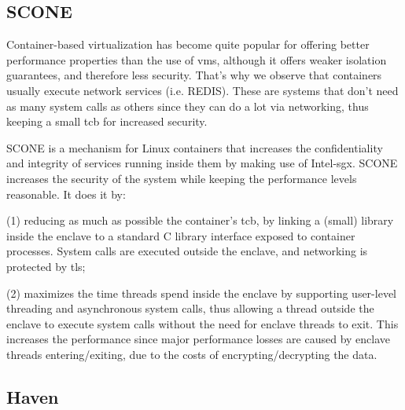 \subsection{SCONE}
\label{ssec:scone}

Container-based virtualization has become quite popular for offering better performance properties than the use of \gls{vm}s, although it offers weaker isolation guarantees, and therefore less security. 
That's why we observe that containers usually execute network services (i.e. REDIS). These are systems that don't need as many system calls as others since they can do a lot via networking, thus keeping a small \gls{tcb} for increased security.

SCONE \cite{sconePaper} is a mechanism for Linux containers that increases the confidentiality and integrity of services running inside them by making use of Intel-\gls{sgx}.
SCONE increases the security of the system while keeping the performance levels reasonable. 
It does it by: 

(1) reducing as much as possible the container's \gls{tcb}, by linking a (small) library inside the enclave to a standard C library interface exposed to container processes. System calls are executed outside the enclave, and networking is protected by \gls{tls};

(2) maximizes the time threads spend inside the enclave by supporting user-level threading and asynchronous system calls, thus allowing a thread outside the enclave to execute system calls without the need for enclave threads to exit.
This increases the performance since major performance losses are caused by enclave threads entering/exiting, due to the costs of encrypting/decrypting the data.



\subsection{Haven}
\label{ssec:haven}

